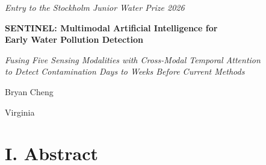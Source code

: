 \documentclass[12pt]{article}
\begin{document}
\thispagestyle{empty}
\begin{center}
\vspace*{1.5in}

{\large \textit{Entry to the Stockholm Junior Water Prize 2026}}

\vspace{0.8in}

{\LARGE \textbf{SENTINEL: Multimodal Artificial Intelligence for\\[6pt]
Early Water Pollution Detection}}

\vspace{0.3in}

{\large \textit{Fusing Five Sensing Modalities with Cross-Modal Temporal Attention\\
to Detect Contamination Days to Weeks Before Current Methods}}

\vspace{1.0in}

{\Large Bryan Cheng}

\vspace{0.3in}

{\large Virginia}

\vspace{\fill}
\end{center}

\newpage
\setcounter{page}{1}

\section*{I. Abstract}
\end{document}
